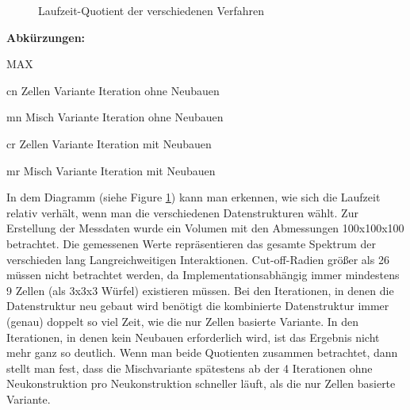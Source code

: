 \documentclass[
	12pt,
	a4paper,
	BCOR10mm,
	DIV14,
	headsepline,
]{scrreprt}
\begin{document}
	\begin{figure}[h]
		\centering
		\caption{Laufzeit-Quotient der verschiedenen Verfahren}
		\label{figure:LaufzeitQuotient}
	\end{figure}
	\footnotesize\textbf{Abkürzungen:}\begin{labeling}[~--]{MAX}
		\item[cn] Zellen Variante Iteration ohne Neubauen
		\item[mn] Misch Variante Iteration ohne Neubauen
		\item[cr] Zellen Variante Iteration mit Neubauen
		\item[mr] Misch Variante Iteration mit Neubauen
	\end{labeling}
	In dem Diagramm (siehe Figure \ref{figure:LaufzeitQuotient}) kann man erkennen, wie sich die Laufzeit relativ verhält, wenn man die verschiedenen Datenstrukturen wählt. Zur Erstellung der Messdaten wurde ein Volumen mit den Abmessungen 100x100x100  betrachtet. Die gemessenen Werte repräsentieren das gesamte Spektrum der verschieden lang Langreichweitigen Interaktionen. Cut-off-Radien größer als 26 müssen nicht betrachtet werden, da Implementationsabhängig immer mindestens 9 Zellen (als 3x3x3 Würfel) existieren müssen. Bei den Iterationen, in denen die Datenstruktur neu gebaut wird benötigt die kombinierte Datenstruktur immer (genau) doppelt so viel Zeit, wie die nur Zellen basierte Variante. In den Iterationen, in denen kein Neubauen erforderlich wird, ist das Ergebnis nicht mehr ganz so deutlich.
	Wenn man beide Quotienten zusammen betrachtet, dann stellt man fest, dass die Mischvariante spätestens ab der 4 Iterationen ohne Neukonstruktion pro Neukonstruktion schneller läuft, als die nur Zellen basierte Variante.
\newpage
\end{document}
